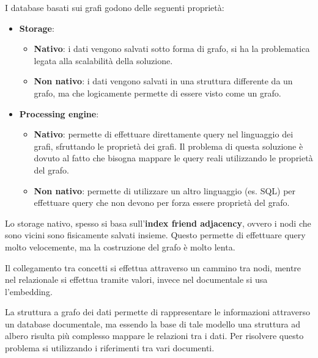       I database basati sui grafi godono delle seguenti proprietà:
      \begin{itemize}
            \item \textbf{Storage}:
                  \begin{itemize}
                        \item \textbf{Nativo}: i dati vengono salvati sotto forma di
                              grafo, si ha la problematica legata alla scalabilità
                              della soluzione.
                        \item \textbf{Non nativo}: i dati vengono salvati in una struttura
                              differente da un grafo, ma che logicamente permette di essere
                              visto come un grafo.
                  \end{itemize}
            \item \textbf{Processing engine}:
                  \begin{itemize}
                        \item \textbf{Nativo}: permette di effettuare direttamente query
                              nel linguaggio dei grafi, sfruttando le proprietà dei
                              grafi. Il problema di questa soluzione è dovuto al fatto
                              che bisogna mappare le query reali utilizzando le proprietà
                              del grafo.
                        \item \textbf{Non nativo}: permette di utilizzare un altro
                              linguaggio (es. SQL) per effettuare query che non devono
                              per forza essere proprietà del grafo.
                  \end{itemize}
      \end{itemize}
      Lo storage nativo, spesso si basa sull'\textbf{index friend adjacency}, ovvero
      i nodi che sono vicini sono fisicamente salvati insieme. Questo permette di
      effettuare query molto velocemente, ma la costruzione del grafo è molto lenta.

      Il collegamento tra concetti si effettua attraverso un cammino tra nodi, mentre
      nel relazionale si effettua tramite valori, invece nel documentale si usa l'embedding.

      La struttura a grafo dei dati permette di rappresentare le informazioni
      attraverso un database documentale, ma essendo la base di tale modello una
      struttura ad albero risulta più complesso mappare le relazioni tra i dati.
      Per risolvere questo problema si utilizzando i riferimenti tra vari documenti.

